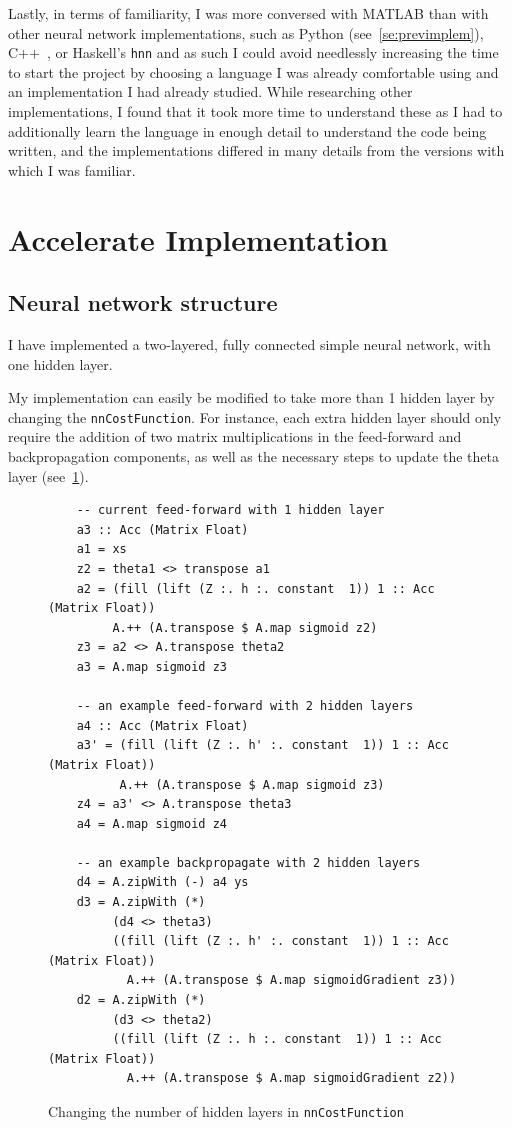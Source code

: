Lastly, in terms of familiarity, I was more conversed with MATLAB than with other neural network implementations, such as Python (see~\ref{se:previmplem}), C++~\cite{Wol17}, or Haskell's \texttt{hnn} and as such I could avoid needlessly increasing the time to start the project by choosing a language I was already comfortable using and an implementation I had already studied. While researching other implementations, I found that it took more time to understand these as I had to additionally learn the language in enough detail to understand the code being written, and the implementations differed in many details from the versions with which I was familiar.

\section{Accelerate Implementation} \label{se:impl.acc}

\subsection{Neural network structure} \label{se:impl.nn.struct}

I have implemented a two-layered, fully connected simple neural network, with one hidden layer.

My implementation can easily be modified to take more than 1 hidden layer by changing the \texttt{nnCostFunction}. For instance, each extra hidden layer should only require the addition of two matrix multiplications in the feed-forward and backpropagation components, as well as the necessary steps to update the theta layer (see~\ref{fig:nnCostFunction.hiddenlayers}).

\begin{figure}
  \begin{lstlisting}
    -- current feed-forward with 1 hidden layer
    a3 :: Acc (Matrix Float)
    a1 = xs 
    z2 = theta1 <> transpose a1 
    a2 = (fill (lift (Z :. h :. constant  1)) 1 :: Acc (Matrix Float)) 
         A.++ (A.transpose $ A.map sigmoid z2) 
    z3 = a2 <> A.transpose theta2 
    a3 = A.map sigmoid z3
    
    -- an example feed-forward with 2 hidden layers
    a4 :: Acc (Matrix Float)
    a3' = (fill (lift (Z :. h' :. constant  1)) 1 :: Acc (Matrix Float))
          A.++ (A.transpose $ A.map sigmoid z3)
    z4 = a3' <> A.transpose theta3
    a4 = A.map sigmoid z4
    
    -- an example backpropagate with 2 hidden layers
    d4 = A.zipWith (-) a4 ys
    d3 = A.zipWith (*) 
         (d4 <> theta3)
         ((fill (lift (Z :. h' :. constant  1)) 1 :: Acc (Matrix Float)) 
           A.++ (A.transpose $ A.map sigmoidGradient z3)) 
    d2 = A.zipWith (*) 
         (d3 <> theta2)
         ((fill (lift (Z :. h :. constant  1)) 1 :: Acc (Matrix Float)) 
           A.++ (A.transpose $ A.map sigmoidGradient z2)) 
  \end{lstlisting}
  \caption{Changing the number of hidden layers in \texttt{nnCostFunction}}
  \label{fig:nnCostFunction.hiddenlayers}
\end{figure}

